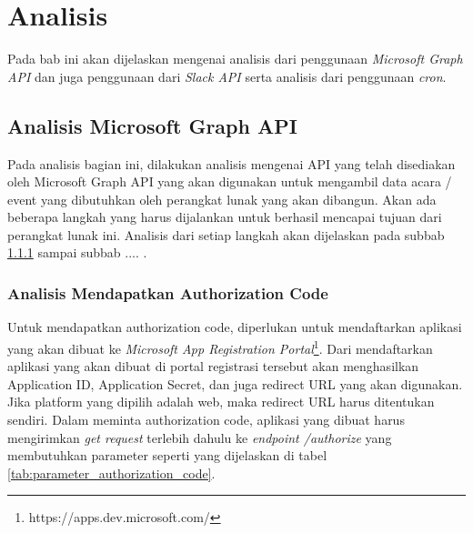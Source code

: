 \chapter{Analisis}
\label{chap:analisis}

Pada bab ini akan dijelaskan mengenai analisis dari penggunaan \textit{Microsoft Graph API} dan juga penggunaan dari \textit{Slack API} serta analisis dari penggunaan \textit{cron}. 

\section{Analisis Microsoft Graph API}
\label{sec:analisis_microsoft_graph_api}

Pada analisis bagian ini, dilakukan analisis mengenai API yang telah disediakan oleh Microsoft Graph API yang akan digunakan untuk mengambil data acara / event yang dibutuhkan oleh perangkat lunak yang akan dibangun. Akan ada beberapa langkah yang harus dijalankan untuk berhasil mencapai tujuan dari perangkat lunak ini. Analisis dari setiap langkah akan dijelaskan pada subbab \ref{analisis_authorization_code} sampai subbab .... .

\subsection{Analisis Mendapatkan Authorization Code}
\label{analisis_authorization_code}
Untuk mendapatkan authorization code, diperlukan untuk mendaftarkan aplikasi yang akan dibuat ke \textit{Microsoft App Registration Portal}\footnote{https://apps.dev.microsoft.com/}. Dari mendaftarkan aplikasi yang akan dibuat di portal registrasi tersebut akan menghasilkan Application ID, Application Secret, dan juga redirect URL yang akan digunakan. Jika platform yang dipilih adalah web, maka redirect URL harus ditentukan sendiri. Dalam meminta authorization code, aplikasi yang dibuat harus mengirimkan \textit{get request} terlebih dahulu ke \textit{endpoint /authorize} yang membutuhkan parameter seperti yang dijelaskan di tabel \ref{tab:parameter_authorization_code}. 

